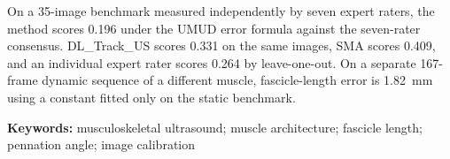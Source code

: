 \documentclass[11pt]{article}
\begin{document}
\vspace{0.6em}
\noindent On a 35-image benchmark measured independently by seven expert raters, the
method scores 0.196 under the UMUD error formula against the seven-rater
consensus. DL\_Track\_US scores 0.331 on the same images, SMA scores 0.409, and
an individual expert rater scores 0.264 by leave-one-out. On a separate
167-frame dynamic sequence of a different muscle, fascicle-length error is
1.82~mm using a constant fitted only on the static benchmark.

\vspace{1.2em}
\noindent\textbf{Keywords:} musculoskeletal ultrasound; muscle architecture; fascicle
length; pennation angle; image calibration
\end{document}
